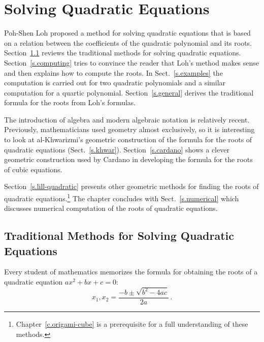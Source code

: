 
\chapter{Solving Quadratic Equations}\label{c.quadratic}




Poh-Shen Loh proposed a method for solving quadratic equations that is based on a relation between the coefficients of the quadratic polynomial and its roots. Section~\ref{s.traditional} reviews the traditional methods for solving quadratic equations. 
Section~\ref{s.computing} tries to convince the reader that Loh's method makes sense and then explains how to compute the roots. In Sect.~\ref{s.examples} the computation is carried out for two quadratic polynomials and a similar computation for a quartic polynomial. Section~\ref{s.general} derives the traditional formula for the roots from Loh's formulas.

The introduction of algebra and modern algebraic notation is relatively recent. Previously, mathematicians used geometry almost exclusively, so it is interesting to look at al-Khwarizmi's geometric construction of the formula for the roots of quadratic equations (Sect.~\ref{s.khwar}). Section~\ref{s.cardano} shows a clever geometric construction used by Cardano in developing the formula for the roots of cubic equations.

Section~\ref{s.lill-quadratic} presents other geometric methods for finding the roots of quadratic equations.\footnote{Chapter~\ref{c.origami-cube} is a prerequisite for a full understanding of these methods.} The chapter concludes with Sect.~\ref{s.numerical} which discusses numerical computation of the roots of quadratic equations.

\section{Traditional Methods for Solving Quadratic Equations}\label{s.traditional}
Every student of mathematics memorizes the formula for obtaining the roots of a quadratic equation $ax^2+bx+c=0$:
\[
x_1, x_2 = \frac{-b\pm\sqrt{b^2-4ac}}{2a}\,.
\]                      

